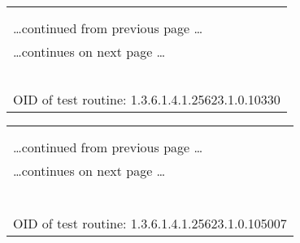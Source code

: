 \documentclass{article}
\begin{document}
\begin{longtable}{|p{}|}
\hline
\rowcolor{openvas_log}{\color{white}{Log (CVSS: 0.0) }}\\
\rowcolor{openvas_log}{\color{white}{NVT: Services}}\\
\hline
\endfirsthead
\hfill\ldots continued from previous page \ldots \\
\hline
\endhead
\hline
\ldots continues on next page \ldots \\
\endfoot
\hline
\endlastfoot
\\
\rowcolor{white}{\verb=An IMAP server is running on this port=}\\
\rowcolor{white}{\verb==}\\
\rowcolor{white}{\verb==}\\
\\
OID of test routine: 1.3.6.1.4.1.25623.1.0.10330\\
\end{longtable}

\begin{longtable}{|p{}|}
\hline
\rowcolor{openvas_log}{\color{white}{Log (CVSS: 0.0) }}\\
\rowcolor{openvas_log}{\color{white}{NVT: IMAP STARTTLS Detection}}\\
\hline
\endfirsthead
\hfill\ldots continued from previous page \ldots \\
\hline
\endhead
\hline
\ldots continues on next page \ldots \\
\endfoot
\hline
\endlastfoot
\\
\rowcolor{white}{\verb= Summary:=}\\
\rowcolor{white}{\verb= The remote IMAP Server supports the STARTTLS command.=}\\
\rowcolor{white}{\verb==}\\
\rowcolor{white}{\verb==}\\
\\
OID of test routine: 1.3.6.1.4.1.25623.1.0.105007\\
\end{longtable}
\end{document}
